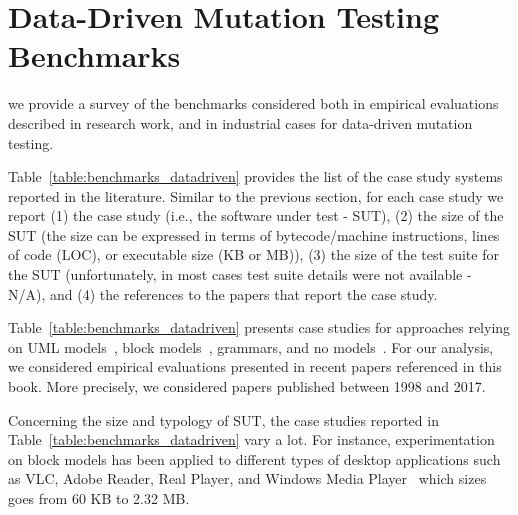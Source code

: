 


\clearpage

\section{Data-Driven Mutation Testing Benchmarks}
\label{section:industry:data}

 we provide a survey of the benchmarks considered both in empirical evaluations described in research work, and in industrial cases for data-driven mutation testing.


Table~\ref{table:benchmarks_datadriven} provides the list of the case study systems reported in the literature. Similar to the previous section, for each case study we report (1) the case study (i.e., the software under test - SUT), (2) the size of the SUT (the size can be expressed in terms of bytecode/machine instructions, lines of code (LOC), or executable size (KB or MB)), (3) the size of the test suite for the SUT (unfortunately, in most cases test suite details were not available - N/A), and (4) the references to the papers that report the case study.

Table~\ref{table:benchmarks_datadriven} presents case studies for approaches relying on UML models~\cite{di2017augmenting}, block models~\cite{pham2016model}, grammars, and no models~\cite{AFL:industrialcases}.
For our analysis, we considered empirical evaluations presented in recent papers referenced in this book. More precisely, we considered papers published between 1998 and 2017.

Concerning the size and typology of SUT, the case studies reported in Table~\ref{table:benchmarks_datadriven} vary a lot.
For instance, experimentation on block models has been applied to different types of desktop applications such as VLC, Adobe Reader, Real Player, and Windows Media Player~\cite{pham2016model} which sizes goes from 60 KB to 2.32 MB. 

